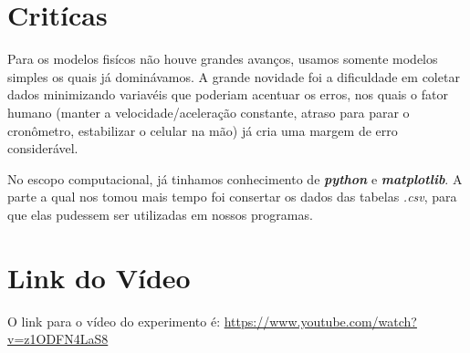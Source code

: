 \documentclass[a4paper, 12pt]{article}
\begin{document}
\section*{Critícas}
Para os modelos fisícos não houve grandes avanços, usamos somente modelos
simples os quais já dominávamos. A grande novidade foi a dificuldade em coletar
dados minimizando variavéis que poderiam acentuar os erros, nos quais o fator
humano (manter a velocidade/aceleração constante, atraso para parar o
cronômetro, estabilizar o celular na mão) já cria uma margem de erro considerável. 

No escopo computacional, já tinhamos conhecimento de \textit{\textbf{python}} e
\textit{\textbf{matplotlib}}. A parte a qual nos tomou mais tempo foi consertar
os dados das tabelas \textit{.csv}, para que elas pudessem ser utilizadas em
nossos programas.

\section*{Link do Vídeo}
O link para o vídeo do experimento é:
\url{https://www.youtube.com/watch?v=z1ODFN4LaS8}
\end{document}
